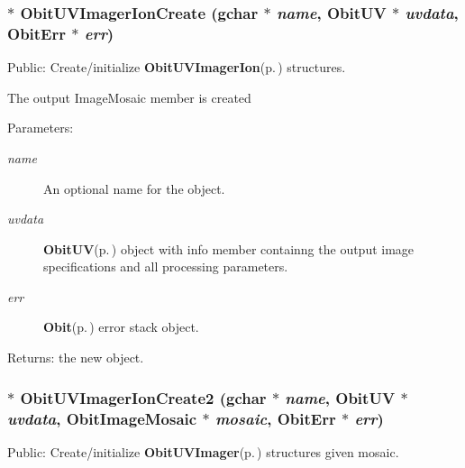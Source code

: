 \subsubsection{$\ast$ Obit\-UVImager\-Ion\-Create (gchar $\ast$ {\em name}, {\bf Obit\-UV} $\ast$ {\em uvdata}, {\bf Obit\-Err} $\ast$ {\em err})}\label{ObitUVImagerIon_8h_a9}


Public: Create/initialize {\bf Obit\-UVImager\-Ion}{\rm (p.\,\pageref{structObitUVImagerIon})} structures. 

The output Image\-Mosaic member is created \begin{Desc}
\item[Parameters:]
\begin{description}
\item[{\em name}]An optional name for the object. \item[{\em uvdata}]{\bf Obit\-UV}{\rm (p.\,\pageref{structObitUV})} object with info member containng the output image specifications and all processing parameters. \item[{\em err}]{\bf Obit}{\rm (p.\,\pageref{structObit})} error stack object. \end{description}
\end{Desc}
\begin{Desc}
\item[Returns:]the new object. \end{Desc}
\subsubsection{$\ast$ Obit\-UVImager\-Ion\-Create2 (gchar $\ast$ {\em name}, {\bf Obit\-UV} $\ast$ {\em uvdata}, {\bf Obit\-Image\-Mosaic} $\ast$ {\em mosaic}, {\bf Obit\-Err} $\ast$ {\em err})}\label{ObitUVImagerIon_8h_a10}


Public: Create/initialize {\bf Obit\-UVImager}{\rm (p.\,\pageref{structObitUVImager})} structures given mosaic. 

